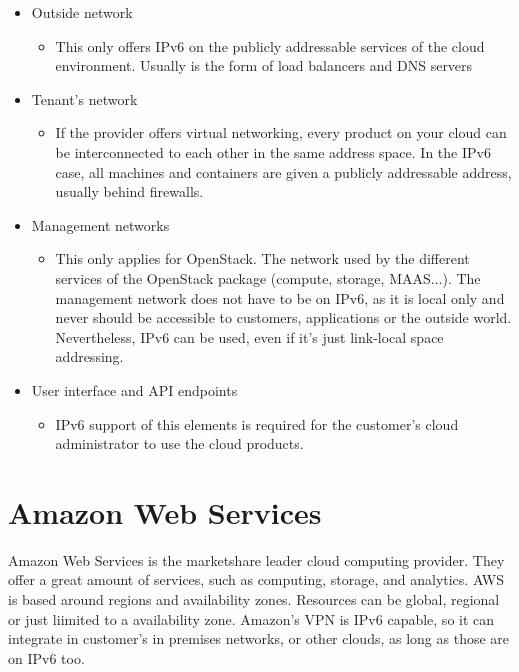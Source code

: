 \begin{itemize}
	\item Outside network
	\begin{itemize}
		\item This only offers IPv6 on the publicly addressable services of the cloud environment. Usually is the form of load balancers and DNS servers
	\end{itemize}
	\item Tenant's network
	\begin{itemize}
		\item If the provider offers virtual networking, every product on your cloud can be interconnected to each other in the same address space. In the IPv6 case, all machines and containers are given a publicly addressable address, usually behind firewalls.
	\end{itemize}
	\item Management networks
	\begin{itemize}
		\item This only applies for OpenStack. The network used by the different services of the OpenStack package (compute, storage, MAAS...). The management network does not have to be on IPv6, as it is local only and never should be accessible to customers, applications or the outside world. Nevertheless, IPv6 can be used, even if it's just link-local space addressing.
		
	\end{itemize}
	\item User interface and API endpoints
	\begin{itemize}
		\item IPv6 support of this elements is required for the customer's cloud administrator to use the cloud products. 
	\end{itemize}
\end{itemize}

\section{Amazon Web Services}

Amazon Web Services is the marketshare leader cloud computing provider. They offer a great amount of services, such as computing, storage, and analytics. AWS is based around regions and availability zones. Resources can be global, regional or just liimited to a availability zone. Amazon's VPN is IPv6 capable, so it can integrate in customer's in premises networks, or other clouds, as long as those are on IPv6 too.


